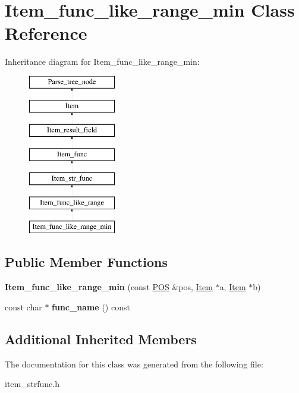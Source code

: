 \hypertarget{classItem__func__like__range__min}{}\section{Item\+\_\+func\+\_\+like\+\_\+range\+\_\+min Class Reference}
\label{classItem__func__like__range__min}
Inheritance diagram for Item\+\_\+func\+\_\+like\+\_\+range\+\_\+min\+:\begin{figure}[H]
\begin{center}
\leavevmode
\includegraphics[height=7.000000cm]{classItem__func__like__range__min}
\end{center}
\end{figure}
\subsection*{Public Member Functions}
\begin{DoxyCompactItemize}
\item 
\mbox{\label{classItem__func__like__range__min_ad169579761820e66e3ca6be748411431}} 
{\bfseries Item\+\_\+func\+\_\+like\+\_\+range\+\_\+min} (const \mbox{\hyperlink{structYYLTYPE}{P\+OS}} \&pos, \mbox{\hyperlink{classItem}{Item}} $\ast$a, \mbox{\hyperlink{classItem}{Item}} $\ast$b)
\item 
\mbox{\label{classItem__func__like__range__min_a8a137b0a4e13ab7ea73be96c0c32cf6c}} 
const char $\ast$ {\bfseries func\+\_\+name} () const
\end{DoxyCompactItemize}
\subsection*{Additional Inherited Members}


The documentation for this class was generated from the following file\+:\begin{DoxyCompactItemize}
\item 
item\+\_\+strfunc.\+h\end{DoxyCompactItemize}
